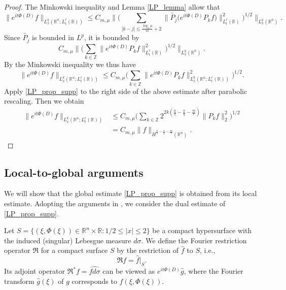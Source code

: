 \documentclass[11pt,reqno]{amsart}
\theoremstyle{plain}
\theoremstyle{definition}
\theoremstyle{remark}
\numberwithin{equation}{section}
\begin{document}
\begin{proof}
The Minkowski inequality and Lemma \ref{LP_lemma} allow that
    \[
    \big\|e^{it\Phi(D)} f \big\|_{L_x^q(\mathbb R^n;L_t^r(\mathbb R))}
    \leq C_{m,\mu} \bigg\|\bigg(  \sum_{|k -j| \le  \frac{\log_2 \mu}{m}+2} \Big\| \widetilde{P_j} \big( e^{it\Phi(D)} P_kf \big) \Big\|_{L_t^r(\mathbb R)}^2  \bigg)^{1/2} \bigg\|_{L^q_x(\mathbb R^n)}.
    \]
Since $\widetilde{P_j}$ is bounded in $L^p$, it is bounded by
    \[
    C_{m,\mu} \bigg\|\bigg(  \sum_{k \in \mathbb Z} \big\| e^{it\Phi(D)} P_kf  \big\|_{L_t^r(\mathbb R)}^2  \bigg)^{1/2} \bigg\|_{L^q_x(\mathbb R^n)}.
    \]
By the Minkowski inequality we thus have
    \[
    \big\|e^{it\Phi(D)} f \big\|_{L_x^q(\mathbb R^n;L_t^r(\mathbb R))}
    \leq C_{m,\mu} \bigg( \sum_{k\in \mathbb{Z}}  \big\| e^{it\Phi(D)} P_kf \big\|_{L_x^q(\mathbb R^n;L_t^r(\mathbb R))}^2 \bigg)^{1/2}.
\]
Apply \eqref{LP_prop_supp} to the right side of the above estimate after parabolic rescaling. Then we obtain
    \begin{align*}
    \|e^{it\Phi(D)} f \|_{L_x^q(\mathbb R^n;L_t^r(\mathbb R))}
    &\leq C_{m,\mu} \bigg(\sum_{k\in\mathbb{Z}} 2^{2k(\frac{n}{2}-\frac{n}{q}-\frac{m}{r} )}\| P_kf \|_2^2 \bigg)^{1/2} \\
    &= C_{m,\mu} \| f\|_{\dot{H}^{\frac{n}{2}-\frac{n}{q}-\frac{m}{r}}(\mathbb R^n)}.
    \end{align*}
\end{proof}


\subsection{Local-to-global arguments}
We will show that the global estimate  
\eqref{LP_prop_supp} is obtained from its local estimate. Adopting the arguments in \cite{T1}, we consider the dual estimate of \eqref{LP_prop_supp}. 


Let $S=\{(\xi, \Phi(\xi)) \in \mathbb R^n \times \mathbb R: 1/2 \le |x| \le 2 \}$ be a compact hypersurface with the induced (singular) Lebesgue measure $d\sigma$.
We define the Fourier restriction operator $\mathfrak R$ for a compact surface $S$ by the restriction of $\hat f$ to $S$, i.e.,
\[
\mathfrak Rf = \hat f \big|_S.
\]
Its adjoint operator $\mathfrak R^*f = \widehat{fd\sigma}$ can be viewed as $e^{it\Phi(D)}\hat{g}$, where the Fourier transform $\hat g(\xi)$ of $g$ corresponds to $f(\xi, \Phi(\xi))$. 
\end{document}
